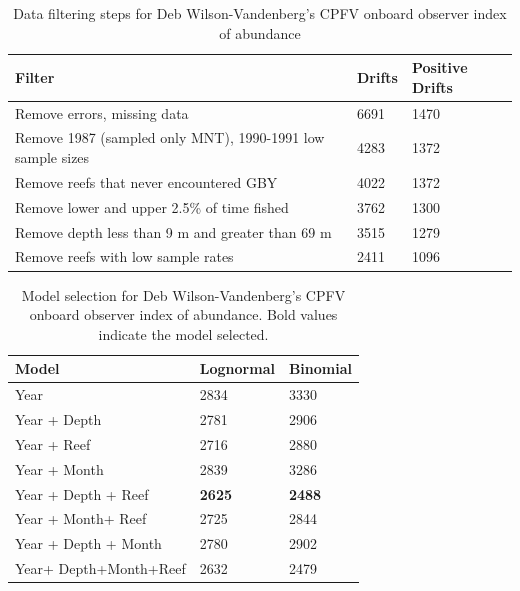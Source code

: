 \documentclass[12pt,]{article}
\begin{document}
\FloatBarrier

\begin{table}[ht]
\centering
\caption{Data filtering steps for Deb Wilson-Vandenberg's CPFV onboard observer 
                                        index of abundance} 
\label{tab:Fleet5_Filter}
\begin{tabular}{lll}
  \hline
Filter & Drifts & Positive Drifts \\ 
  \hline
Remove errors, missing data & 6691 & 1470 \\ 
  Remove 1987 (sampled only MNT), 1990-1991 low sample sizes & 4283 & 1372 \\ 
  Remove reefs that never encountered GBY & 4022 & 1372 \\ 
  Remove lower and upper 2.5\% of time fished & 3762 & 1300 \\ 
  Remove depth less than 9 m and greater than 69 m & 3515 & 1279 \\ 
  Remove reefs with low sample rates & 2411 & 1096 \\ 
   \hline
\end{tabular}
\end{table}

\vspace{3cm}

\begin{table}[ht]
\centering
\caption{Model selection for Deb Wilson-Vandenberg's CPFV onboard observer 
                                        index of abundance. Bold values indicate the model selected.} 
\label{tab:Fleet5_AIC}
\begin{tabular}{lll}
  \hline
Model & Lognormal & Binomial \\ 
  \hline
Year & 2834 & 3330 \\ 
  Year + Depth & 2781 & 2906 \\ 
  Year + Reef & 2716 & 2880 \\ 
  Year + Month & 2839 & 3286 \\ 
  Year + Depth + Reef & \textbf{2625} & \textbf{2488} \\ 
  Year + Month+ Reef & 2725 & 2844 \\ 
  Year + Depth + Month & 2780 & 2902 \\ 
  Year+ Depth+Month+Reef & 2632 & 2479 \\ 
   \hline
\end{tabular}
\end{table}

\FloatBarrier
\end{document}
